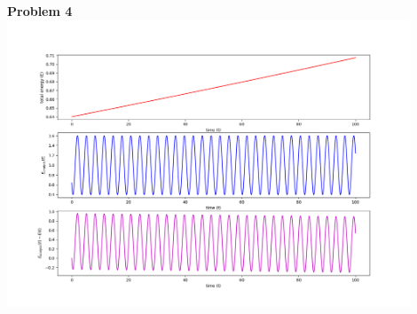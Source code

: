 \documentclass[12pt]{article}
\begin{document}
	\indent\textbf{Problem 4}\\
		\includegraphics[width=0.9\textwidth]{energyPlot.png}\\
		
\end{document}
